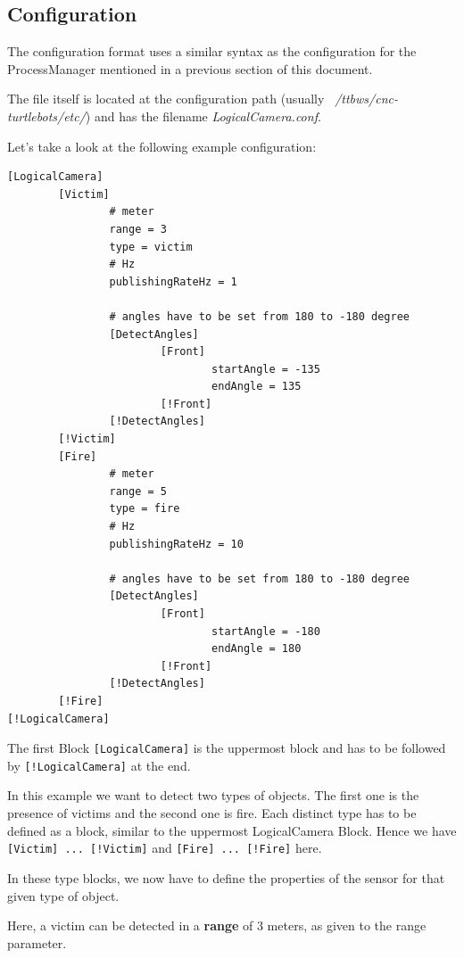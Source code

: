 \newpage
\subsection{Configuration}

The configuration format uses a similar syntax as the configuration for
the ProcessManager mentioned in a previous section of this document.

The file itself is located at the configuration path
(usually \textit{~/ttbws/cnc-turtlebots/etc/}) and has the filename \textit{LogicalCamera.conf}.

Let's take a look at the following example configuration:

\begin{verbatim}
[LogicalCamera]
        [Victim]
                # meter
                range = 3
                type = victim
                # Hz
                publishingRateHz = 1

                # angles have to be set from 180 to -180 degree
                [DetectAngles]
                        [Front]
                                startAngle = -135
                                endAngle = 135
                        [!Front]
                [!DetectAngles]
        [!Victim]
        [Fire]
                # meter
                range = 5
                type = fire
                # Hz
                publishingRateHz = 10

                # angles have to be set from 180 to -180 degree
                [DetectAngles]
                        [Front]
                                startAngle = -180
                                endAngle = 180
                        [!Front]
                [!DetectAngles]
        [!Fire]
[!LogicalCamera]
\end{verbatim}

The first Block \texttt{[LogicalCamera]} is the uppermost block and has to be
followed by \texttt{[!LogicalCamera]} at the end.

In this example we want to detect two types of objects. The first one is
the presence of victims and the second one is fire.
Each distinct type has to be defined as a block, similar to the
uppermost LogicalCamera Block. Hence we have \texttt{[Victim] ... [!Victim]} and
\texttt{[Fire] ... [!Fire]} here.

In these type blocks, we now have to define the properties of the sensor
for that given type of object.

Here, a victim can be detected in a \textbf{range} of 3 meters, as given to 
the range parameter.

